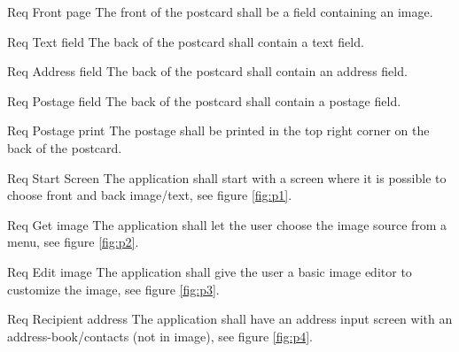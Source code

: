 \documentclass[10pt,a4paper]{article}
\begin{document}
\begin {description}
	\item [Req \thesubsubsection {.\thedesign} Front page] The front of the postcard shall be a field containing an image.
	\item [Req \thesubsubsection {.\thedesign} Text field] The back of the postcard shall contain a text field.
	\item [Req \thesubsubsection {.\thedesign} Address field] The back of the postcard shall contain an address field.
	\item [Req \thesubsubsection {.\thedesign} Postage field] The back of the postcard shall contain a postage field. 
	\item [Req \thesubsubsection {.\thedesign} Postage print] The postage shall be printed in the top right corner on the back of the postcard. 


	\item [Req \thesubsubsection {.\thedesign} Start Screen] The application shall start with a screen where it is possible to choose front and back image/text, see figure \ref{fig:p1}.
	\item [Req \thesubsubsection {.\thedesign} Get image] The application shall let the user choose the image source from a menu, see figure \ref{fig:p2}.
	\item [Req \thesubsubsection {.\thedesign} Edit image]The application shall give the user a basic image editor to customize the image, see figure \ref{fig:p3}.
	\item [Req \thesubsubsection {.\thedesign} Recipient address] The application shall have an address input screen with an address-book/contacts (not in image), see figure \ref{fig:p4}.
\end{description}
\end{document}
